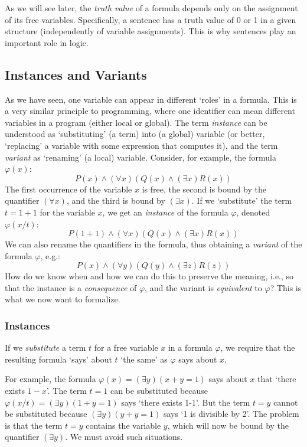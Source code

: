 \begin{remark}
As we will see later, the \emph{truth value} of a formula depends only on the assignment of its free variables. Specifically, a sentence has a truth value of 0 or 1 in a given structure (independently of variable assignments). This is why sentences play an important role in logic.
\end{remark}


\subsection{Instances and Variants}

As we have seen, one variable can appear in different `roles' in a formula. This is a very similar principle to programming, where one identifier can mean different variables in a program (either local or global). The term \emph{instance} can be understood as `substituting' (a term) into (a global) variable (or better, `replacing' a variable with some expression that computes it), and the term \emph{variant} as `renaming' (a local) variable. Consider, for example, the formula $\varphi(x)$:
$$
P(x)\land (\forall x)(Q(x) \land (\exists x)R(x))
$$
The first occurrence of the variable $x$ is free, the second is bound by the quantifier $(\forall x)$, and the third is bound by $(\exists x)$. If we `substitute' the term $t=1+1$ for the variable $x$, we get an \emph{instance} of the formula $\varphi$, denoted $\varphi(x/t)$:
$$
P(1+1)\land (\forall x)(Q(x) \land (\exists x)R(x))
$$
We can also rename the quantifiers in the formula, thus obtaining a \emph{variant} of the formula $\varphi$, e.g.:
$$
P(x)\land (\forall y)(Q(y) \land (\exists z)R(z))
$$
How do we know when and how we can do this to preserve the meaning, i.e., so that the instance is a \emph{consequence} of $\varphi$, and the variant is \emph{equivalent} to $\varphi$? This is what we now want to formalize.


\subsubsection{Instances}

If we \emph{substitute} a term $t$ for a free variable $x$ in a formula $\varphi$, we require that the resulting formula `says' about $t$ `the same' as $\varphi$ says about $x$.

\begin{example}
    For example, the formula $\varphi(x)=(\exists y)(x+y=1)$ says about $x$ that `there exists $1-x$'. The term $t=1$ can be substituted because $\varphi(x/t)=(\exists y)(1+y=1)$ says `there exists 1-1'. But the term $t=y$ cannot be substituted because $(\exists y)(y+y=1)$ says `1 is divisible by 2'. The problem is that the term $t=y$ contains the variable $y$, which will now be bound by the quantifier $(\exists y)$. We must avoid such situations.
\end{example}

